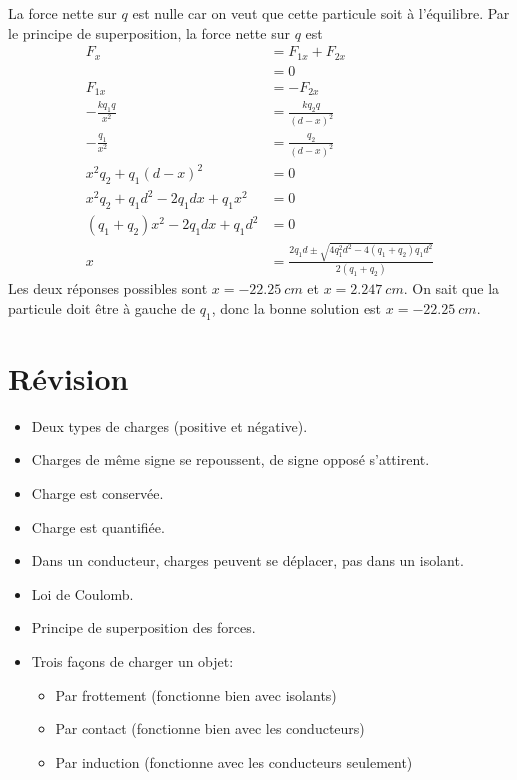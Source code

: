 \begin{reponsebox}
La force nette sur $q$ est nulle car on veut que cette particule soit à
l'équilibre.  Par le principe de superposition, la force nette sur $q$ est
\begin{align*}
     F_x &= F_{1x} + F_{2x} \\
         &= 0  \\
  F_{1x} &= -F_{2x} \\
  -\frac{kq_1q}{x^2} &= \frac{kq_2q}{(d - x)^2} \\
  -\frac{q_1}{x^2} &= \frac{q_2}{(d - x)^2} \\
  x^2q_2 + q_1(d - x)^2 &= 0 \\
  x^2q_2 + q_1d^2 - 2q_1dx + q_1x^2 &= 0 \\
  (q_1 + q_2) x^2 - 2 q_1 d x + q_1d^2 &= 0 \\
  x &= \frac{2q_1 d \pm \sqrt{4q_1^2d^2 - 4(q_1 + q_2) q_1 d^2}}{2(q_1 + q_2)}
\end{align*}
Les deux réponses possibles sont $x = \SI{-22.25}{cm}$ et $x = \SI{2.247}{cm}$.
On sait que la particule doit être à gauche de $q_1$, donc la bonne solution
est $x = \SI{-22.25}{cm}$.
\end{reponsebox}


\sectionline


\section{Révision}

\begin{itemize}
  \item Deux types de charges (positive et négative).
  \item Charges de même signe se repoussent, de signe opposé s'attirent.
  \item Charge est conservée.
  \item Charge est quantifiée.
  \item Dans un conducteur, charges peuvent se déplacer, pas dans un isolant.
  \item Loi de Coulomb.
  \item Principe de superposition des forces.
  \item Trois façons de charger un objet:
    \begin{itemize}
      \item Par frottement (fonctionne bien avec isolants)
      \item Par contact (fonctionne bien avec les conducteurs)
      \item Par induction (fonctionne avec les conducteurs seulement)
    \end{itemize}
\end{itemize}


